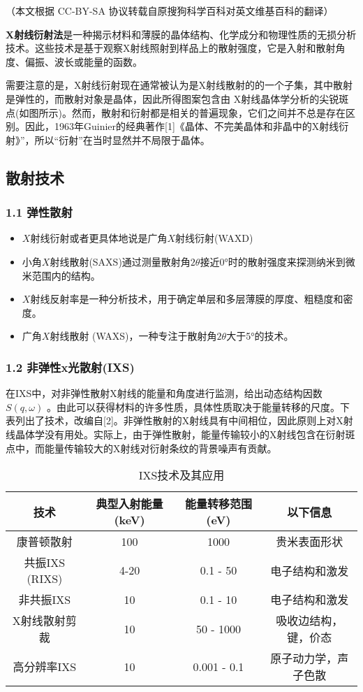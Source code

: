 
（本文根据 CC-BY-SA 协议转载自原搜狗科学百科对英文维基百科的翻译）

\textbf{X射线衍射法}是一种揭示材料和薄膜的晶体结构、化学成分和物理性质的无损分析技术。这些技术是基于观察X射线照射到样品上的散射强度，它是入射和散射角度、偏振、波长或能量的函数。

需要注意的是，X射线衍射现在通常被认为是X射线散射的的一个子集，其中散射是弹性的，而散射对象是晶体，因此所得图案包含由 X射线晶体学分析的尖锐斑点(如图所示)。然而，散射和衍射都是相关的普遍现象，它们之间并不总是存在区别。因此，1963年Guinier的经典著作[1]《晶体、不完美晶体和非晶中的X射线衍射》”，所以“衍射”在当时显然并不局限于晶体。

\subsection{散射技术}
\subsubsection{1.1 弹性散射}
\begin{itemize}
\item $X$射线衍射或者更具体地说是广角$X$射线衍射(WAXD)
\item 小角$X$射线散射(SAXS)通过测量散射角$2\theta$接近0°时的散射强度来探测纳米到微米范围内的结构。
\item $X$射线反射率是一种分析技术，用于确定单层和多层薄膜的厚度、粗糙度和密度。
\item 广角$X$射线散射 (WAXS)，一种专注于散射角$2\theta$大于5°的技术。
\end{itemize}
\subsubsection{1.2 非弹性x光散射(IXS)}
在IXS中，对非弹性散射X射线的能量和角度进行监测，给出动态结构因数 $S(q, \omega)$ 。由此可以获得材料的许多性质，具体性质取决于能量转移的尺度。下表列出了技术，改编自[2]。非弹性散射的X射线具有中间相位，因此原则上对X射线晶体学没有用处。实际上，由于弹性散射，能量传输较小的X射线包含在衍射斑点中，而能量传输较大的X射线对衍射条纹的背景噪声有贡献。

\begin{table}[h]
    \centering
    \begin{tabular}{|c|c|c|c|}
        \hline
        技术 & 典型入射能量 (keV) & 能量转移范围 (eV) & 以下信息 \\
        \hline
        康普顿散射 & 100 & 1000 & 贵米表面形状 \\
        \hline
        共振IXS (RIXS) & 4-20 & 0.1 - 50 & 电子结构和激发 \\
        \hline
        非共振IXS & 10 & 0.1 - 10 & 电子结构和激发 \\
        \hline
        X射线散射剪裁 & 10 & 50 - 1000 & 吸收边结构，键，价态 \\
        \hline
        高分辨率IXS & 10 & 0.001 - 0.1 & 原子动力学，声子色散 \\
        \hline
    \end{tabular}
    \caption{IXS技术及其应用}
\end{table}
